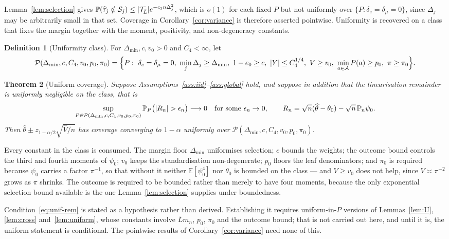 \documentclass[11pt]{article}
\theoremstyle{plain}
\newtheorem{theorem}{Theorem}[section]
\theoremstyle{definition}
\newtheorem{definition}[theorem]{Definition}
\theoremstyle{remark}
\newcommand{\E}{\mathbb{E}}
\newcommand{\PP}{\mathbb{P}}
\newcommand{\Pn}{\mathbb{P}_n}
\newcommand{\cA}{\mathcal{A}}
\newcommand{\cT}{\mathcal{T}}
\newcommand{\cS}{\mathcal{S}}
\newcommand{\cP}{\mathcal{P}}
\newcommand{\ez}{e_0}
\newcommand{\that}{\widehat{\tau}}
\newcommand{\thetahat}{\widehat{\theta}}
\newcommand{\Vhat}{\widehat{V}}
\DeclarePairedDelimiter{\abs}{\lvert}{\rvert}
\DeclarePairedDelimiter{\card}{\lvert}{\rvert}
\begin{document}
Lemma~\ref{lem:selection} gives
$\PP(\that_j\notin\cS_j)\le\card{\cT_{\bar L}}e^{-c_1n\Delta_j^2}$, which is
$o(1)$ for each fixed $P$ but not uniformly over
$\{P:\delta_e=\delta_\mu=0\}$, since $\Delta_j$ may be arbitrarily small in that
set. Coverage in Corollary~\ref{cor:variance} is therefore asserted pointwise.
Uniformity is recovered on a class that fixes the margin together with the
moment, positivity, and non-degeneracy constants.

\begin{definition}[Uniformity class]\label{def:uniformity}
For $\Delta_{\min},c,v_0>0$ and $C_4<\infty$, let
\[
  \cP(\Delta_{\min},c,C_4,v_0,p_0,\pi_0)
  =\Bigl\{P:\ \delta_e=\delta_\mu=0,\ \min_j\Delta_j\ge\Delta_{\min},\
  1-\ez\ge c,\ \abs Y\le C_4^{1/4},\ V\ge v_0,\ \min_{a\in\cA}P(a)\ge p_0,\
  \pi\ge\pi_0\Bigr\}.
\]
\end{definition}

\begin{theorem}[Uniform coverage]\label{thm:uniform-cover}
Suppose Assumptions~\ref{ass:iid}--\ref{ass:global} hold, and suppose in addition
that the linearisation remainder is uniformly negligible on the class, that is
\begin{equation}\label{eq:unif-rem}
  \sup_{P\in\cP(\Delta_{\min},c,C_4,v_0,p_0,\pi_0)}
  \PP_P\bigl(\abs{R_n}>\epsilon_n\bigr)\longrightarrow0
  \quad\text{for some }\epsilon_n\to0,\qquad
  R_n=\sqrt n(\thetahat-\theta_0)-\sqrt n\,\Pn\psi_0 .
\end{equation}
Then $\thetahat\pm z_{1-\alpha/2}\sqrt{\Vhat/n}$ has coverage converging to
$1-\alpha$ uniformly over $\cP(\Delta_{\min},c,C_4,v_0,p_0,\pi_0)$.
\end{theorem}

\noindent Every constant in the class is consumed. The margin floor
$\Delta_{\min}$ uniformises selection; $c$ bounds the weights; the outcome bound
controls the third and fourth moments of $\psi_0$; $v_0$ keeps the standardisation
non-degenerate; $p_0$ floors the leaf denominators; and $\pi_0$ is required
because $\psi_0$ carries a factor $\pi^{-1}$, so that without it neither
$\E[\psi_0^4]$ nor $\theta_0$ is bounded on the class --- and $V\ge v_0$ does not
help, since $V\asymp\pi^{-2}$ grows as $\pi$ shrinks. The outcome is required to be
bounded rather than merely to have four moments, because the only exponential
selection bound available is the one Lemma~\ref{lem:selection} supplies under
boundedness.

Condition~\eqref{eq:unif-rem} is stated as a hypothesis rather than derived.
Establishing it requires uniform-in-$P$ versions of Lemmas~\ref{lem:U},
\ref{lem:cross} and~\ref{lem:uniform}, whose constants involve $\bar Lm_n$, $p_0$,
$\pi_0$ and the outcome bound; that is not carried out here, and until it is, the
uniform statement is conditional. The pointwise results of
Corollary~\ref{cor:variance} need none of this.
\end{document}

